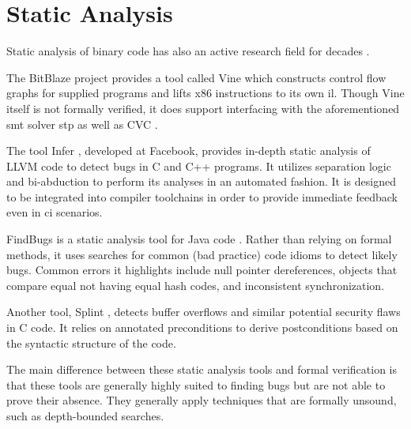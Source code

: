 
\section{Static Analysis}\label{se:static_analysis}
Static analysis of binary code has also an active research field
for decades  \autocite{kruegel2005automating,brumley2011bap,wang2017angr}.

The BitBlaze project  \autocite{song2008bitblaze,BitBlazeWebSite}
provides a tool called Vine which constructs control flow graphs
for supplied programs and lifts x86 instructions to its own \ac{il}.
Though Vine itself is not formally verified,
it does support interfacing with the aforementioned \ac{smt} solver \ac{stp}
as well as CVC \autocite{barrett2004cvcl,barrett2007cvc3}.

The tool Infer \autocite{calcagno2011infer}, developed at Facebook,
provides in-depth static analysis of LLVM code to detect bugs in C and C++ programs.
It utilizes separation logic  \autocite{reynolds2002separation}
and bi-abduction to perform its analyses in an automated fashion.
It is designed to be integrated into compiler toolchains
in order to provide immediate feedback even in \ac{ci} scenarios.

FindBugs is a static analysis tool for Java code \autocite{hovemeyer2004findbugs}.
Rather than relying on formal methods,
it uses searches for common (bad practice) code idioms to detect likely bugs.
Common errors it highlights include null pointer dereferences,
objects that compare equal not having equal hash codes,
and inconsistent synchronization.

Another tool, Splint \autocite{evans2002static}, detects buffer overflows
and similar potential security flaws in C code.
It relies on annotated preconditions to derive postconditions
based on the syntactic structure of the code.

The main difference between these static analysis tools and formal verification
is that these tools are generally highly suited to finding bugs
but are not able to prove their absence.
They generally apply techniques that are formally unsound, such as depth-bounded searches.


